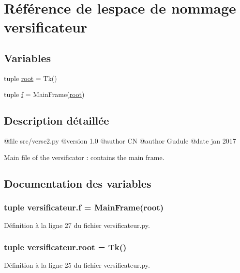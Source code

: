 \hypertarget{namespaceversificateur}{}\section{Référence de l\textquotesingle{}espace de nommage versificateur}
\label{namespaceversificateur}
\subsection*{Variables}
\begin{DoxyCompactItemize}
\item 
tuple \hyperlink{namespaceversificateur_a492410d017b39101b0fcca0107f32054}{root} = Tk()
\item 
tuple \hyperlink{namespaceversificateur_aa68b6b402d5beb144af68c18d9fd286d}{f} = Main\+Frame(\hyperlink{namespaceversificateur_a492410d017b39101b0fcca0107f32054}{root})
\end{DoxyCompactItemize}


\subsection{Description détaillée}
\begin{DoxyVerb}@file src/verse2.py
@version 1.0
@author CN
@author Gudule
@date jan 2017


Main file of the versificator : contains the main frame.
\end{DoxyVerb}
 

\subsection{Documentation des variables}
\hypertarget{namespaceversificateur_aa68b6b402d5beb144af68c18d9fd286d}{}
\subsubsection[{f}]{\setlength{\rightskip}{0pt plus 5cm}tuple versificateur.\+f = Main\+Frame({\bf root})}\label{namespaceversificateur_aa68b6b402d5beb144af68c18d9fd286d}


Définition à la ligne 27 du fichier versificateur.\+py.

\hypertarget{namespaceversificateur_a492410d017b39101b0fcca0107f32054}{}
\subsubsection[{root}]{\setlength{\rightskip}{0pt plus 5cm}tuple versificateur.\+root = Tk()}\label{namespaceversificateur_a492410d017b39101b0fcca0107f32054}


Définition à la ligne 25 du fichier versificateur.\+py.

